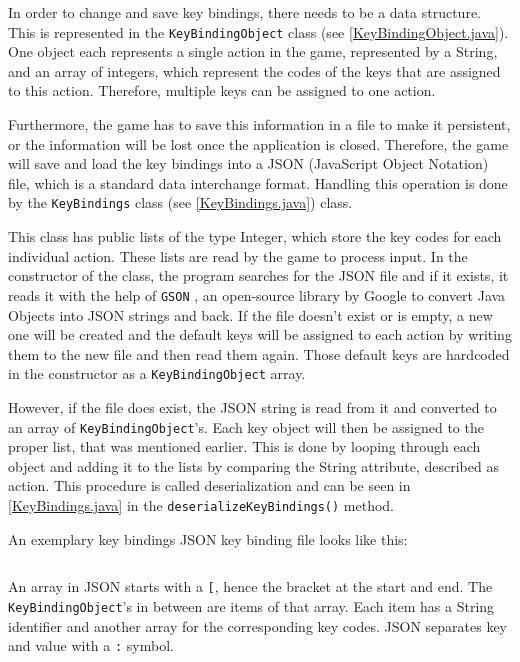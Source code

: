 \documentclass[12p]{article}
\begin{document}
In order to change and save key bindings, there needs to be a data structure. This is represented in the \texttt{KeyBindingObject} class (see \ref{KeyBindingObject.java}). One object each represents a single action in the game, represented by a String, and an array of integers, which represent the codes of the keys that are assigned to this action. Therefore, multiple keys can be assigned to one action.

Furthermore, the game has to save this information in a file to make it persistent, or the information will be lost once the application is closed. Therefore, the game will save and load the key bindings into a JSON (JavaScript Object Notation) file, which is a standard data interchange format. Handling this operation is done by the \texttt{KeyBindings} class (see \ref{KeyBindings.java}) class. 

This class has public lists of the type Integer, which store the key codes for each individual action. These lists are read by the game to process input. In the constructor of the class, the program searches for the JSON file and if it exists, it reads it with the help of \texttt{GSON} \cite{GSON}, an open-source library by Google to convert Java Objects into JSON strings and back. If the file doesn't exist or is empty, a new one will be created and the default keys will be assigned to each action by writing them to the new file and then read them again. Those default keys are hardcoded in the constructor as a \texttt{KeyBindingObject} array.

However, if the file does exist, the JSON string is read from it and converted to an array of \texttt{KeyBindingObject}'s. Each key object will then be assigned to the proper list, that was mentioned earlier. This is done by looping through each object and adding it to the lists by comparing the String attribute, described as \texttt{}{action}. This procedure is called deserialization and can be seen in \ref{KeyBindings.java} in the \texttt{deserializeKeyBindings()} method.

An exemplary key bindings JSON key binding file looks like this:
\inputminted[linenos,breaklines]{json}{code/json/keybindings.json}

An array in JSON starts with a \texttt{[}, hence the bracket at the start and end. The \texttt{KeyBindingObject}'s in between are items of that array. Each item has a String identifier and another array for the corresponding key codes. JSON separates key and value with a \texttt{:} symbol.
\end{document}
